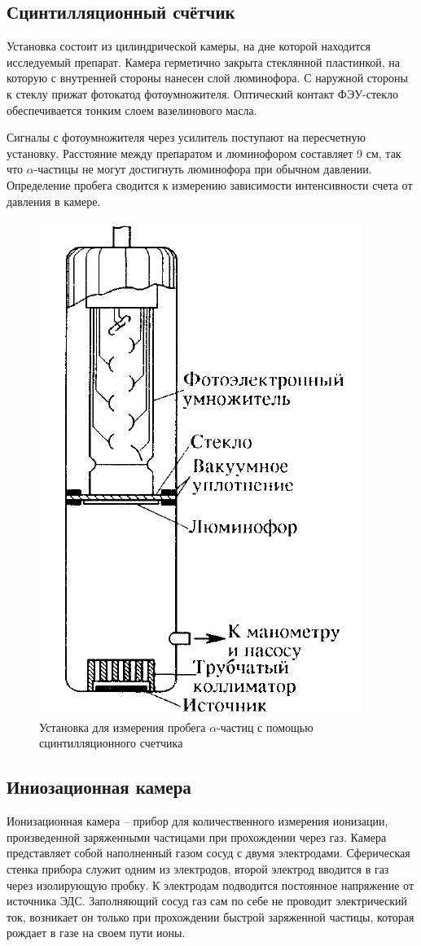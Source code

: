 \documentclass[a4paper, 12pt]{article}%
\begin{document}
\subsection{Сцинтилляционный счётчик}

    Установка состоит из цилиндрической камеры, на дне которой находится исследуемый препарат. Камера герметично закрыта стеклянной пластинкой, на которую с внутренней стороны нанесен слой люминофора. С наружной стороны к стеклу прижат фотокатод фотоумножителя. Оптический контакт ФЭУ-стекло обеспечивается тонким слоем вазелинового масла.
        
    
    Сигналы с фотоумножителя через усилитель поступают на пересчетную установку. Расстояние между препаратом и люминофором составляет 9 см, так что $\alpha$-частицы не могут достигнуть люминофора при обычном давлении. Определение пробега сводится к измерению зависимости интенсивности счета от давления в камере.

    \begin{figure}[h!]
        \centering
        \includegraphics[width = 6 cm]{pic3.png}
        \caption{Установка для измерения пробега $\alpha$-частиц с помощью сцинтилляционного счетчика}
        \label{}
    \end{figure}
    
\subsection{Иниозационная камера}

    Ионизационная камера -- прибор для количественного измерения ионизации, произведенной заряженными частицами при прохождении
    через газ. Камера представляет собой наполненный газом сосуд с двумя электродами. Сферическая стенка прибора служит одним из электродов, второй электрод вводится в газ через изолирующую пробку. К электродам подводится постоянное напряжение от источника ЭДС.
    Заполняющий сосуд газ сам по себе не проводит электрический ток, возникает он только при прохождении быстрой заряженной частицы, которая
    рождает в газе на своем пути ионы.
\end{document}
